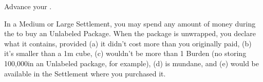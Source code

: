 \begin{multicols*}{2}

Advance your  \DCUP.


In a Medium or Large Settlement, you may spend any amount of money during the  to buy an Unlabeled Package. When the package is unwrapped, you declare what it contains, provided (a) it didn't cost more than you originally paid, (b) it's smaller than a 1m cube, (c) wouldn't be more than 1 Burden  (no storing 100,000\AU in an Unlabeled package, for example), (d) is mundane, and (e) would be available in the Settlement where you purchased it.


\end{multicols*}
